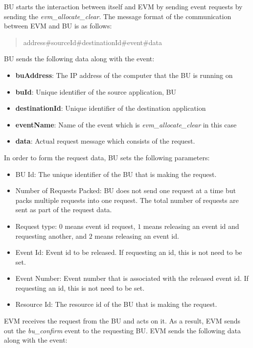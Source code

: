 BU starts the interaction between itself and EVM by sending event requests by sending the \textit{evm\_allocate\_clear}. The message format of the communication between EVM and BU is as follows: 
\begin{quote}
	address\#sourceId\#destinationId\#event\#data
\end{quote}

BU sends the following data along with the event:

\begin{itemize}
	\item \textbf{buAddress}: The IP address of the computer that the BU is running on
	\item \textbf{buId}: Unique identifier of the source application, BU
	\item \textbf{destinationId}: Unique identifier of the destination application
	\item \textbf{eventName}: Name of the event which is \textit{evm\_allocate\_clear} in this case
	\item \textbf{data}: Actual request message which consists of the request.
\end{itemize}

In order to form the request data, BU sets the following parameters:
\begin{itemize}
	\item BU Id: The unique identifier of the BU that is making the request.
	\item Number of Requests Packed: BU does not send one request at a time but packs multiple requests into one request. The total number of requests are sent as part of the request data.
	\item Request type: $0$ means event id request, $1$ means releasing an event id and requesting another, and $2$ means releasing an event id.
	\item Event Id: Event id to be released. If requesting an id, this is not need to be set.
	\item Event Number: Event number that is associated with the released event id. If requesting an id, this is not need to be set.
	\item Resource Id: The resource id of the BU that is making the request.
\end{itemize}

EVM receives the request from the BU and acts on it. As a result, EVM sends out the \textit{bu\_confirm} event to the requesting BU. EVM sends the following data along with the event:

